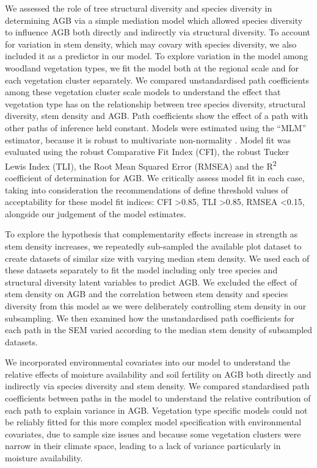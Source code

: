 \documentclass[11pt,a4paper]{article}
\begin{document}
We assessed the role of tree structural diversity and species diversity in determining AGB via a simple mediation model which allowed species diversity to influence AGB both directly and indirectly via structural diversity. To account for variation in stem density, which may covary with species diversity, we also included it as a predictor in our model. To explore variation in the model among woodland vegetation types, we fit the model both at the regional scale and for each vegetation cluster separately. We compared unstandardised path coefficients among these vegetation cluster scale models to understand the effect that vegetation type has on the relationship between tree species diversity, structural diversity, stem density and AGB. Path coefficients show the effect of a path with other paths of inference held constant. Models were estimated using the ``MLM'' estimator, because it is robust to multivariate non-normality \citep{Shapiro1983}. Model fit was evaluated using the robust Comparative Fit Index (CFI), the robust Tucker Lewis Index (TLI), the Root Mean Squared Error  (RMSEA) and the R\textsuperscript{2} coefficient of determination for AGB. We critically assess model fit in each case, taking into consideration the recommendations of \citet{Hu1999}  define threshold values of acceptability for these model fit indices: CFI >0.85, TLI >0.85, RMSEA <0.15, alongside our judgement of the model estimates.

To explore the hypothesis that complementarity effects increase in strength as stem density increases, we repeatedly sub-sampled the available plot dataset to create \subn{} datasets of similar size with varying median stem density. We used each of these datasets separately to fit the model including only tree species and structural diversity latent variables to predict AGB. We excluded the effect of stem density on AGB and the correlation between stem density and species diversity from this model as we were deliberately controlling stem density in our subsampling. We then examined how the unstandardised path coefficients for each path in the SEM varied according to the median stem density of subsampled datasets.

We incorporated environmental covariates into our model to understand the relative effects of moisture availability and soil fertility on AGB both directly and indirectly via species diversity and stem density. We compared standardised path coefficients between paths in the model to understand the relative contribution of each path to explain variance in AGB. Vegetation type specific models could not be reliably fitted for this more complex model specification with environmental covariates, due to sample size issues and because some vegetation clusters were narrow in their climate space, leading to a lack of variance particularly in moisture availability.
\end{document}
